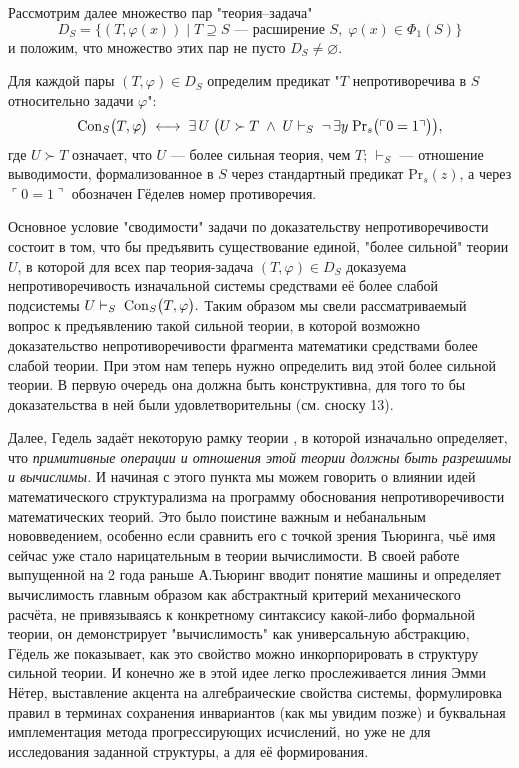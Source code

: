 \documentclass[14pt]{extarticle}
\begin{document}
	
	\smallskip
	
	\noindent Рассмотрим далее множество пар "теория–задача"
	\[
	D_S = \{ (T, \varphi(x)) \mid T \supseteq S \text{ — расширение } S, \; \varphi(x) \in \Phi_1(S) \}
	\] и положим, что множество этих пар не пусто \(D_S\neq\varnothing\).
	
	\smallskip
	
	\noindent Для каждой пары \((T,\varphi)\in D_S\) определим предикат "\(T\) непротиворечива в \(S\) относительно задачи \(\varphi\)":
	\[
	\mathrm{Con}_S\bigl(T,\varphi\bigr)
	\;\longleftrightarrow\;
	\exists\,U\;\bigl(U\succ T\;\wedge\;
	U\vdash_S\;\neg\,\exists y\;\text{Pr}_s\bigl(\ulcorner0=1\urcorner\bigr)\bigr),
	\]
	где \(U\succ T\) означает, что \(U\) — более сильная теория, чем \(T\); \(\vdash_S\) — отношение выводимости, формализованное в \(S\) через стандартный предикат \(\text{Pr}_s(z)\), а через \(\ulcorner0=1\urcorner\) обозначен Гёделев номер противоречия.
	
	\smallskip
	
	\noindent Основное условие "сводимости" задачи по доказательству непротиворечивости состоит в том, что бы предъявить существование единой, "более сильной" теории \(U\), в которой для всех пар теория-задача \((T,\varphi)\in D_S\) доказуема непротиворечивость изначальной системы средствами её более слабой подсистемы
	\(
	U\vdash_S\;\mathrm{Con}_S\bigl(T,\varphi\bigr).
	\)	Таким образом мы свели рассматриваемый вопрос к предъявлению такой сильной теории, в которой возможно доказательство непротиворечивости фрагмента математики средствами более слабой теории. При этом нам теперь нужно определить вид этой более сильной теории. В первую очередь она должна быть конструктивна, для того то бы доказательства в ней были удовлетворительны (см. сноску 13). 
	
	Далее, Гедель задаёт некоторую рамку теории \cite[91]{Godel1938}, в которой изначально определяет, что \textit{примитивные операции и отношения этой теории должны быть разрешимы и вычислимы.} И начиная с этого пункта мы можем говорить о влиянии идей математического структурализма на программу обоснования непротиворечивости математических теорий. Это было поистине важным и небанальным нововведением, особенно если сравнить его с точкой зрения Тьюринга, чьё имя сейчас уже стало нарицательным в теории вычислимости. В своей работе выпущенной на 2 года раньше \cite{turing1936} А.Тьюринг вводит понятие машины и определяет вычислимость главным образом как абстрактный критерий механического расчёта, не привязываясь к конкретному синтаксису какой-либо формальной теории, он демонстрирует "вычислимость" как универсальную абстракцию, Гёдель же показывает, как это свойство можно инкорпорировать в структуру сильной теории. И конечно же в этой идее легко прослеживается линия Эмми Нётер, выставление акцента на алгебраические свойства системы, формулировка правил в терминах сохранения инвариантов (как мы увидим позже) и буквальная имплементация метода прогрессирующих исчислений, но уже не для исследования заданной структуры, а для её формирования.	
	
\end{document}

